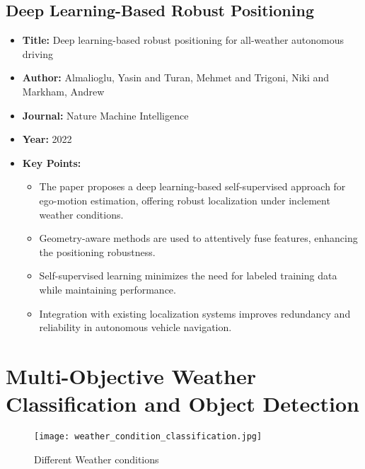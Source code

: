 \subsection{Deep Learning-Based Robust Positioning}
\begin{itemize}
    \item \textbf{Title:} Deep learning-based robust positioning for all-weather autonomous driving \cite{almalioglu2022deep}
    \item \textbf{Author:} Almalioglu, Yasin and Turan, Mehmet and Trigoni, Niki and Markham, Andrew
    \item \textbf{Journal:} Nature Machine Intelligence
    \item \textbf{Year:} 2022
    \item \textbf{Key Points:}
    \begin{itemize}
        \item The paper proposes a deep learning-based self-supervised approach for ego-motion estimation, offering robust localization under inclement weather conditions.
        \item Geometry-aware methods are used to attentively fuse features, enhancing the positioning robustness.
        \item Self-supervised learning minimizes the need for labeled training data while maintaining performance.
        \item Integration with existing localization systems improves redundancy and reliability in autonomous vehicle navigation.
    \end{itemize}
\end{itemize}

\section{Multi-Objective Weather Classification and Object Detection}

\begin{figure}[h]
	\centering
	\texttt{[image: weather\_condition\_classification.jpg]}
	\caption{Different Weather conditions}
	\label{fig: img2}
\end{figure}


